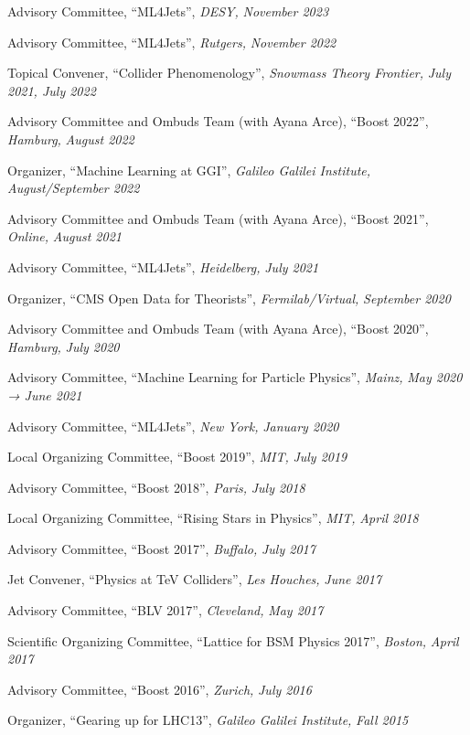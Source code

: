 \item Advisory Committee, ``ML4Jets'', \emph{DESY, }\emph{November 2023}
\item Advisory Committee, ``ML4Jets'', \emph{Rutgers, }\emph{November 2022}
\item Topical Convener, ``Collider Phenomenology'', \emph{Snowmass Theory Frontier, }\emph{July 2021, July 2022}
\item Advisory Committee and Ombuds Team (with Ayana Arce), ``Boost 2022'', \emph{Hamburg, }\emph{August 2022}
\item Organizer, ``Machine Learning at GGI'', \emph{Galileo Galilei Institute, }\emph{August/September 2022}
\item Advisory Committee and Ombuds Team (with Ayana Arce), ``Boost 2021'', \emph{Online, }\emph{August 2021}
\item Advisory Committee, ``ML4Jets'', \emph{Heidelberg, }\emph{July 2021}
\item Organizer, ``CMS Open Data for Theorists'', \emph{Fermilab/Virtual, }\emph{September 2020}
\item Advisory Committee and Ombuds Team (with Ayana Arce), ``Boost 2020'', \emph{Hamburg, }\emph{July 2020}
\item Advisory Committee, ``Machine Learning for Particle Physics'', \emph{Mainz, }\emph{May 2020 → June 2021}
\item Advisory Committee, ``ML4Jets'', \emph{New York, }\emph{January 2020}
\item Local Organizing Committee, ``Boost 2019'', \emph{MIT, }\emph{July 2019}
\item Advisory Committee, ``Boost 2018'', \emph{Paris, }\emph{July 2018}
\item Local Organizing Committee, ``Rising Stars in Physics'', \emph{MIT, }\emph{April 2018}
\item Advisory Committee, ``Boost 2017'', \emph{Buffalo, }\emph{July 2017}
\item Jet Convener, ``Physics at TeV Colliders'', \emph{Les Houches, }\emph{June 2017}
\item Advisory Committee, ``BLV 2017'', \emph{Cleveland, }\emph{May 2017}
\item Scientific Organizing Committee, ``Lattice for BSM Physics 2017'', \emph{Boston, }\emph{April 2017}
\item Advisory Committee, ``Boost 2016'', \emph{Zurich, }\emph{July 2016}
\item Organizer, ``Gearing up for LHC13'', \emph{Galileo Galilei Institute, }\emph{Fall 2015}
